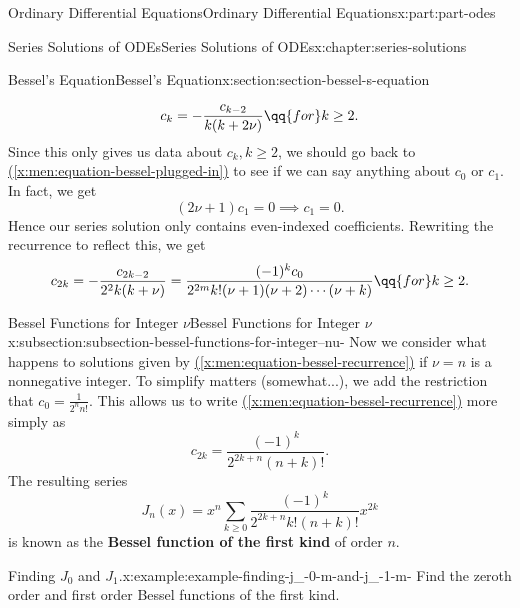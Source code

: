\documentclass[twoside,10pt,]{book}
\newcommand{\xreffont}{\relax}
\newcommand{\terminology}[1]{\textbf{#1}}
\numberwithin{equation}{part}
\begin{document}
\begin{partptx}{Ordinary Differential Equations}{}{Ordinary Differential Equations}{}{}{x:part:part-odes}
\begin{chapterptx}{Series Solutions of ODEs}{}{Series Solutions of ODEs}{}{}{x:chapter:series-solutions}
\begin{sectionptx}{Bessel's Equation}{}{Bessel's Equation}{}{}{x:section:section-bessel-s-equation}
\begin{introduction}{}
\begin{equation*}
c_{k} = -\frac{c_{k-2}}{k(k+2\nu)}\qq{for}k\geq2\text{.}
\end{equation*}
Since this only gives us data about \(c_{k}, k\geq 2\), we should go back to \hyperref[x:men:equation-bessel-plugged-in]{({\xreffont\ref{x:men:equation-bessel-plugged-in}})} to see if we can say anything about \(c_{0}\) or \(c_{1}\). In fact, we get%
\begin{equation*}
(2\nu + 1)c_{1} = 0 \implies c_{1} = 0\text{.}
\end{equation*}
Hence our series solution only contains even-indexed coefficients. Rewriting the recurrence to reflect this, we get%
\begin{equation}
c_{2k} = -\frac{c_{2k - 2}}{2^{2}k(k + \nu)} = \frac{(-1)^{k}c_{0}}{2^{2m}k!(\nu + 1)(\nu + 2)\cdots(\nu + k)}\qq{for} k\geq2.\label{x:men:equation-bessel-recurrence}
\end{equation}
%
\end{introduction}%
%
%
\typeout{************************************************}
\typeout{************************************************}
%
\begin{subsectionptx}{Bessel Functions for Integer \(\nu\)}{}{Bessel Functions for Integer \(\nu\)}{}{}{x:subsection:subsection-bessel-functions-for-integer--nu-}
Now we consider what happens to solutions given by \hyperref[x:men:equation-bessel-recurrence]{({\xreffont\ref{x:men:equation-bessel-recurrence}})} if \(\nu = n\) is a nonnegative integer. To simplify matters (somewhat...), we add the restriction that \(c_{0} = \frac{1}{2^{n}n!}\). This allows us to write \hyperref[x:men:equation-bessel-recurrence]{({\xreffont\ref{x:men:equation-bessel-recurrence}})} more simply as%
\begin{equation}
c_{2k} = \frac{(-1)^{k}}{2^{2k + n}(n + k)!}.\label{x:men:equation-bessel-function-nu-integer}
\end{equation}
The resulting series%
\begin{equation}
J_{n}(x) = x^{n}\sum_{k\geq0}\frac{(-1)^{k}}{2^{2k + n}k!(n + k)!}x^{2k}\label{x:men:equation-bessel-function-first-kind}
\end{equation}
is known as the \terminology{Bessel function of the first kind} of order \(n\).%
\begin{example}{Finding \(J_{0}\) and \(J_{1}\).}{x:example:example-finding-j_-0-m-and-j_-1-m-}%
Find the zeroth order and first order Bessel functions of the first kind.%

\end{example}
\end{subsectionptx}
\end{sectionptx}
\end{chapterptx}
\end{partptx}
\end{document}
